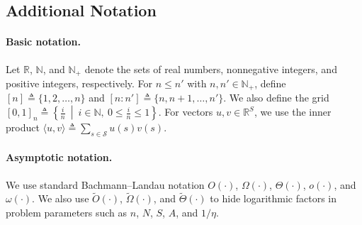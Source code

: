 \documentclass[mnsc,nonblindrev]{informs3}
\newcommand{\States}{\mathcal{S}}
\begin{document}
 \begin{APPENDICES}
\section{Additional Notation}\label{sec:notation}
\paragraph{Basic notation.}
Let $\mathbb{R}$, $\mathbb{N}$, and $\mathbb{N}_+$ denote the sets of real numbers, nonnegative integers, and positive integers, respectively.
For $n \leq n'$ with $n,n' \in \mathbb{N}_+$, define $[n] \triangleq \{1,2,\dots,n\}$ and $[n:n'] \triangleq \{n,n+1,\dots,n'\}$.
We also define the grid $[0,1]_n \triangleq \left\{\frac{i}{n}\ \middle|\ i\in\mathbb{N},\ 0\le \frac{i}{n}\le 1\right\}$.
For vectors $u,v\in\mathbb{R}^{S}$, we use the inner product $\langle u,v\rangle \triangleq \sum_{s\in\States} u(s)v(s)$.

\paragraph{Asymptotic notation.}
We use standard Bachmann--Landau notation $O(\cdot)$, $\Omega(\cdot)$, $\Theta(\cdot)$, $o(\cdot)$, and $\omega(\cdot)$.
We also use $\widetilde{O}(\cdot)$, $\widetilde{\Omega}(\cdot)$, and $\widetilde{\Theta}(\cdot)$ to hide logarithmic factors in problem parameters such as $n$, $N$, $S$, $A$, and $1/\eta$.










\end{APPENDICES}
\end{document}
